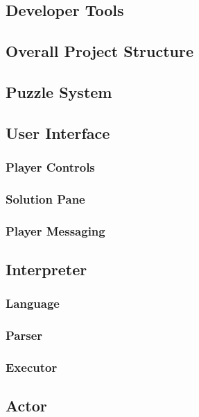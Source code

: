 \subsection{Developer Tools}

\newpage

\subsection{Overall Project Structure}

\newpage

\subsection{Puzzle System}

\newpage

\subsection{User Interface}
\subsubsection{Player Controls}
\subsubsection{Solution Pane}
\subsubsection{Player Messaging}
\newpage

\subsection{Interpreter}
\subsubsection{Language}
\subsubsection{Parser}
\subsubsection{Executor}
\newpage

\subsection{Actor}

\newpage